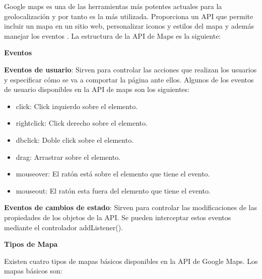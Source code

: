 \vspace{5 mm}

Google maps es una de las herramientas más potentes actuales para la geolocalización y por tanto es la más utilizada. Proporciona un API que permite incluir un mapa en un sitio web, personalizar iconos y estilos del mapa y además manejar los eventos \cite{googleMaps-api}. La estructura de la API de Maps es la siguiente:

\vspace{5 mm}

\textbf{Eventos}

\vspace{5 mm}

 \textbf{Eventos de usuario}: Sirven para controlar las acciones que realizan los usuarios y especificar cómo se va a comportar la página ante ellos. Algunos de los eventos de usuario disponibles en la API de maps son los siguientes:

\begin{itemize}

\item click: Click izquierdo sobre el elemento.

\item rightclick: Click derecho sobre el elemento.

\item dbclick: Doble click sobre el elemento.

\item drag: Arrastrar sobre el elemento.

\item mouseover: El ratón está sobre el elemento que tiene el evento.

\item mouseout: El ratón esta fuera del elemento que tiene el evento.

\end{itemize}

\textbf{Eventos de cambios de estado}: Sirven para controlar las modificaciones de las propiedades de los objetos de la API. Se pueden interceptar estos eventos mediante el controlador addListener().

\vspace{5 mm}

\textbf{Tipos de Mapa}

\vspace{5 mm}

Existen cuatro tipos de mapas básicos disponibles en la API de Google Maps. Los mapas básicos son:

